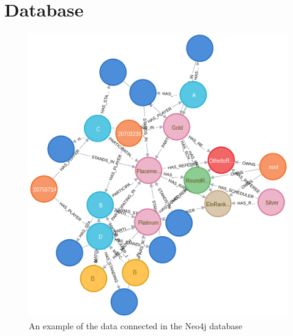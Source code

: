 \documentclass[a4paper, 12pt]{report}
\begin{document}
\section{Database}

\begin{figure}[H]
	\centering
	\includegraphics[scale=0.55]{graph-ex.png}
	\caption{An example of the data connected in the Neo4j database}
	\label{fig:database}
\end{figure}

\printbibliography
\end{document}
